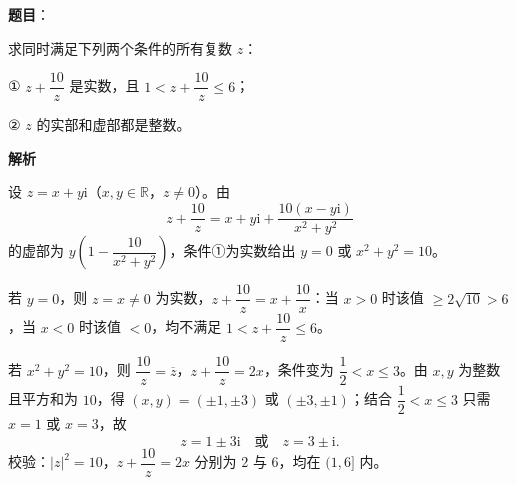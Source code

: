 \begin{answer}

\textbf{题目}：

求同时满足下列两个条件的所有复数 $z$：

① $z+\dfrac{10}{z}$ 是实数，且 $1<z+\dfrac{10}{z}\le6$；

② $z$ 的实部和虚部都是整数。

\textbf{解析}

设 $z=x+y\mathrm{i}$（$x,y\in\mathbb R$，$z\ne0$）。由
\nopagebreak[4]
\[
z+\frac{10}{z}=x+y\mathrm{i}+\frac{10(x-y\mathrm{i})}{x^2+y^2}
\]
的虚部为 $y\left(1-\dfrac{10}{x^2+y^2}\right)$，条件①为实数给出 $y=0$ 或 $x^2+y^2=10$。

若 $y=0$，则 $z=x\ne0$ 为实数，$z+\dfrac{10}{z}=x+\dfrac{10}{x}$：当 $x>0$ 时该值 $\ge2\sqrt{10}>6$，当 $x<0$ 时该值 $<0$，均不满足 $1<z+\dfrac{10}{z}\le6$。

若 $x^2+y^2=10$，则 $\dfrac{10}{z}=\overline z$，$z+\dfrac{10}{z}=2x$，条件变为 $\dfrac12<x\le3$。由 $x,y$ 为整数且平方和为 $10$，得 $(x,y)=(\pm1,\pm3)$ 或 $(\pm3,\pm1)$；结合 $\dfrac12<x\le3$ 只需 $x=1$ 或 $x=3$，故
\nopagebreak[4]
\[
z=1\pm3\mathrm{i}\quad\text{或}\quad z=3\pm\mathrm{i}.
\]
校验：$|z|^2=10$，$z+\dfrac{10}{z}=2x$ 分别为 $2$ 与 $6$，均在 $(1,6]$ 内。


\end{answer}